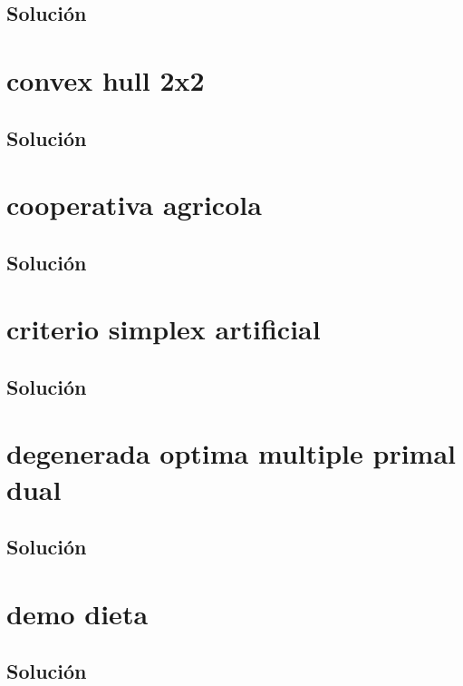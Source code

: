 \documentclass[a4paper,10pt,onecolumn]{report}
\begin{document}
\subsection*{Solución}

\clearpage
\section{convex hull 2x2}

\subsection*{Solución}

\clearpage
\section{cooperativa agricola}

\subsection*{Solución}

\clearpage
\section{criterio simplex artificial}

\subsection*{Solución}

\clearpage
\section{degenerada optima multiple primal dual}

\subsection*{Solución}

\clearpage
\section{demo dieta}

\subsection*{Solución}

\clearpage
\end{document}
